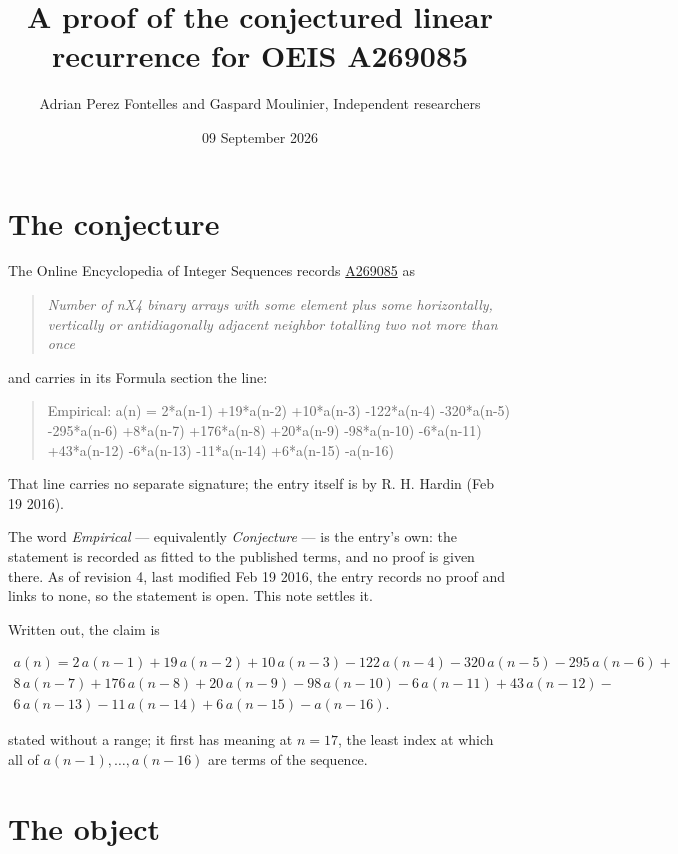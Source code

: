 \documentclass[11pt]{article}
\title{A proof of the conjectured linear recurrence for OEIS A269085}
\author{Adrian Perez Fontelles and Gaspard Moulinier, Independent researchers}
\date{09 September 2026}
\theoremstyle{definition}
\begin{document}
\maketitle
\section{The conjecture}

The Online Encyclopedia of Integer Sequences records \href{https://oeis.org/A269085}{A269085} as

\begin{quote}\itshape Number of nX4 binary arrays with some element plus some horizontally, vertically or antidiagonally adjacent neighbor totalling two not more than once\end{quote}

and carries in its Formula section the line:

\begin{quote}\ttfamily Empirical: a(n) = 2*a(n-1) +19*a(n-2) +10*a(n-3) -122*a(n-4) -320*a(n-5) -295*a(n-6) +8*a(n-7) +176*a(n-8) +20*a(n-9) -98*a(n-10) -6*a(n-11) +43*a(n-12) -6*a(n-13) -11*a(n-14) +6*a(n-15) -a(n-16)\end{quote}

That line carries no separate signature; the entry itself is by R. H. Hardin (Feb 19 2016).

The word {\itshape Empirical} --- equivalently {\itshape Conjecture} --- is the entry's own: the statement is recorded as fitted to the published terms, and no proof is given there. As of revision 4, last modified Feb 19 2016, the entry records no proof and links to none, so the statement is open. This note settles it.

Written out, the claim is

\begin{multline*} a(n) = 2\,a(n-1) + 19\,a(n-2) + 10\,a(n-3) - 122\,a(n-4) - 320\,a(n-5) - 295\,a(n-6) + \\ 8\,a(n-7) + 176\,a(n-8) + 20\,a(n-9) - 98\,a(n-10) - 6\,a(n-11) + 43\,a(n-12) - \\ 6\,a(n-13) - 11\,a(n-14) + 6\,a(n-15) - a(n-16). \end{multline*}

stated without a range; it first has meaning at $n = 17$, the least index at which all of $a(n-1),\dots,a(n-16)$ are terms of the sequence.

\section{The object}
\end{document}
